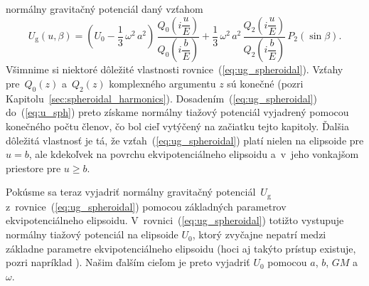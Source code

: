 \documentclass[a4paper, 12pt]{book}
\newcommand{\gidx}{\mathrm g}
\begin{document}
normálny gravitačný potenciál daný vzťahom
%
\begin{equation}
\label{eq:ug_spheroidal}
U_\gidx(u, \beta) = \left( U_0 - \frac{1}{3} \, \omega^2 \, a^2 \right) \, 
\frac{Q_0\left( i \dfrac{u}{E} \right)}{Q_0\left( i \dfrac{b}{E} \right)} 
+ \frac{1}{3} \, \omega^2 \, a^2  \, \frac{Q_2\left( i \dfrac{u}{E} 
\right)}{Q_2\left( i \dfrac{b}{E} \right)} \, P_2(\sin\beta){.}
\end{equation}
%
Všimnime si niektoré dôležité vlastnosti rovnice~(\ref{eq:ug_spheroidal}).  
Vzťahy pre~$Q_0(z)$ a~$Q_2(z)$ komplexného argumentu $z$ sú konečné (pozri 
Kapitolu~\ref{sec:spheroidal_harmonics}).  Dosadením~(\ref{eq:ug_spheroidal}) 
do~(\ref{eq:u_sph}) preto získame normálny tiažový potenciál vyjadrený pomocou 
konečného počtu členov, čo bol cieľ vytýčený na začiatku tejto kapitoly.  
Ďalšia dôležitá vlastnosť je tá, že vzťah~(\ref{eq:ug_spheroidal}) platí nielen 
na elipsoide pre $u = b$, ale kdekoľvek na povrchu ekvipotenciálneho elipsoidu 
a~v~jeho vonkajšom priestore pre $u \geq b$.

Pokúsme sa teraz vyjadriť normálny gravitačný potenciál~$U_\gidx$ 
z~rovnice~(\ref{eq:ug_spheroidal}) pomocou základných parametrov 
ekvipotenciálneho elipsoidu.  V~rovnici~(\ref{eq:ug_spheroidal}) totižto 
vystupuje normálny tiažový potenciál na elipsoide $U_0$, ktorý zvyčajne nepatrí 
medzi základne parametre ekvipotenciálneho elipsoidu (hoci aj takýto prístup 
existuje, pozri napríklad \cite{TorgeGeodesy}).  Našim ďalším cieľom je preto  
vyjadriť $U_0$ pomocou $a$, $b$, $GM$ a~$\omega$.
\end{document}

